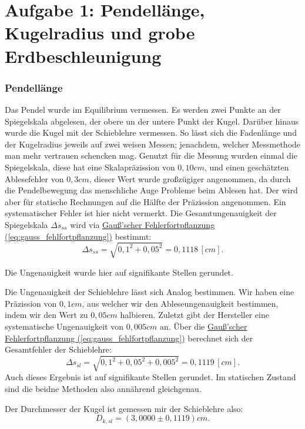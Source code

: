\twocolumn

\section{Aufgabe 1: Pendellänge, Kugelradius und grobe Erdbeschleunigung}
\subsubsection*{Pendellänge}
Das Pendel wurde im Equilibrium vermessen. Es werden zwei Punkte an der Spiegelskala abgelesen, der obere un der untere Punkt der Kugel. Darüber hinaus wurde die Kugel mit der Schieblehre vermessen. So lässt sich die Fadenlänge und der Kugelradius jeweils auf zwei weisen Messen; jenachdem, welcher Messmethode man mehr vertrauen schencken mag.
Genutzt für die Messung wurden einmal die Spiegelskala, diese hat eine Skalapräzission von $0,10cm$, und einen geschätzten Ablesefehler von $0,3cm$, dieser Wert wurde großzügiger angenommen, da durch die Pendelbewegung das menschliche Auge Probleme beim Ablesen hat. Der wird aber für statische Rechnungen auf die Hälfte der Präzission angenommen. Ein systematischer Fehler ist hier nicht vermerkt. Die Gesamtungenauigkeit der Spiegelskala $\Delta s_{ss}$ wird via \hyperref[eq:gauss_fehlfortpflanzung]{Gauß'scher Fehlerfortpflanzung (\ref*{eq:gauss_fehlfortpflanzung})} bestimmt:
\begin{equation}
    \Delta s_{ss} = \sqrt{0,1^2+0,05^2} = 0,1118 \,[cm].
\end{equation}

Die Ungenauigkeit wurde hier auf signifikante Stellen gerundet.

Die Ungenauigkeit der Schieblehre lässt sich Analog bestimmen. Wir haben eine Präzission von $0,1cm$, aus welcher wir den Ableseungenauigkeit bestimmen, indem wir den Wert zu $0,05cm$ halbieren. Zuletzt gibt der Hersteller eine systematische Ungenauigkeit von $0,005cm$ an. Über die \hyperref[eq:gauss_fehlfortpflanzung]{Gauß'scher Fehlerfortpflanzung (\ref*{eq:gauss_fehlfortpflanzung})} berechnet sich der Gesamtfehler der Schieblehre:
\begin{equation}
    \Delta s_{sl} = \sqrt{0,1^2+0,05^2+0,005^2} = 0,1119 \, [cm].
\end{equation}
Auch dieses Ergebnis ist auf signifikante Stellen gerundet. Im statischen Zustand sind die beidne Methoden also annährend gleichgenau.

Der Durchmesser der Kugel ist gemessen mir der Schieblehre also:
\begin{equation}
    D_{k,sl} = (3,0000 \pm 0,1119)cm.
\end{equation}

